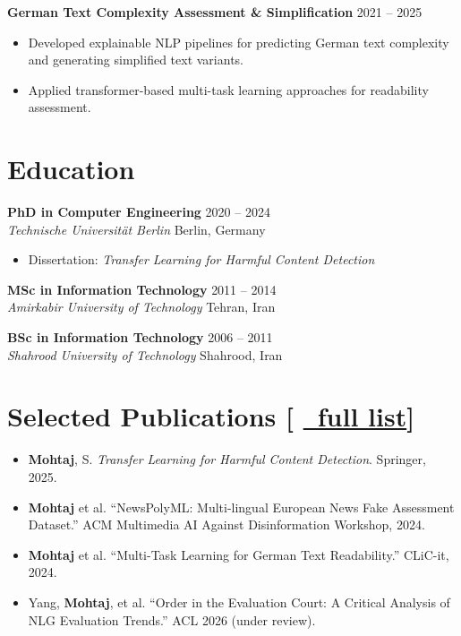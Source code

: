\documentclass[11pt,a4paper]{article}
\newcommand{\cvitem}[1]{
    \item #1
}
\newcommand{\role}[4]{
    \textbf{#1} \hfill {\small #2} \\
    \textit{#3} \hfill {\small #4}
}
\begin{document}
\vspace{0.4em}

\textbf{German Text Complexity Assessment \& Simplification} \hfill 2021 -- 2025

\begin{itemize}
    \cvitem{Developed explainable NLP pipelines for predicting German text complexity and generating simplified text variants.}

    \cvitem{Applied transformer-based multi-task learning approaches for readability assessment.}
\end{itemize}

\vspace{0.7em}

\section*{Education}

\role
{PhD in Computer Engineering}
{2020 -- 2024}
{Technische Universität Berlin}
{Berlin, Germany}
\begin{itemize}
    \cvitem{Dissertation: \textit{Transfer Learning for Harmful Content Detection}}
\end{itemize}


\vspace{0.5em}

\role
{MSc in Information Technology}
{2011 -- 2014}
{Amirkabir University of Technology}
{Tehran, Iran}

\vspace{0.5em}

\role
{BSc in Information Technology}
{2006 -- 2011}
{Shahrood University of Technology}
{Shahrood, Iran}

\vspace{0.7em}

\section*{Selected Publications \small [  
    \href{https://scholar.google.com/citations?user=lnrUBN0AAAAJ}{\faGraduationCap \ full list}]}

\begin{itemize}
    \cvitem{\textbf{Mohtaj}, S. \textit{Transfer Learning for Harmful Content Detection}. Springer, 2025.}

    \cvitem{\textbf{Mohtaj} et al. ``NewsPolyML: Multi-lingual European News Fake Assessment Dataset.'' ACM Multimedia AI Against Disinformation Workshop, 2024.}

    \cvitem{\textbf{Mohtaj} et al. ``Multi-Task Learning for German Text Readability.'' CLiC-it, 2024.}

    \cvitem{Yang, \textbf{Mohtaj}, et al. ``Order in the Evaluation Court: A Critical Analysis of NLG Evaluation Trends.'' ACL 2026 (under review).}
\end{itemize}
\end{document}

